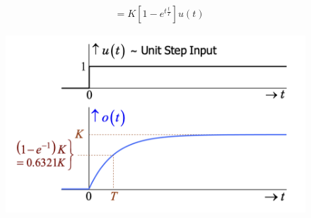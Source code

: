 \begin{enumerate}
\begin{align*}
         &= K[1-e^{t\frac{t}{T}}]u(t)
    \end{align*}
    \begin{figure}[h]
        \centering
        \includegraphics[width=0.75\linewidth]{image/9e19b7ea507f2d6e90b842d6f5b0fac.png}
    \end{figure}
\end{enumerate}
